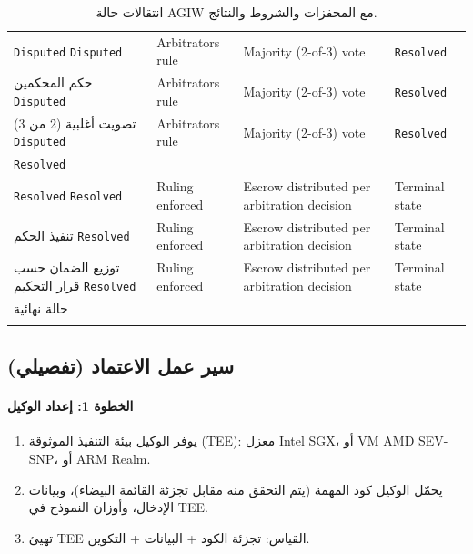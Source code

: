 \documentclass[11pt]{article}
\begin{document}
\begin{longtable}{@{}p{}p{}p{}p{}@{}}
\texttt{Disputed} \texttt{Disputed} & Arbitrators rule & Majority (2-of-3) vote & \texttt{Resolved} \\ حكم المحكمين \texttt{Disputed} & Arbitrators rule & Majority (2-of-3) vote & \texttt{Resolved} \\ تصويت أغلبية (2 من 3) \texttt{Disputed} & Arbitrators rule & Majority (2-of-3) vote & \texttt{Resolved} \\ \texttt{Resolved} \\
\texttt{Resolved} \texttt{Resolved} & Ruling enforced & Escrow distributed per arbitration decision & Terminal state \\\bottomrule تنفيذ الحكم \texttt{Resolved} & Ruling enforced & Escrow distributed per arbitration decision & Terminal state \\\bottomrule توزيع الضمان حسب قرار التحكيم \texttt{Resolved} & Ruling enforced & Escrow distributed per arbitration decision & Terminal state \\\bottomrule حالة نهائية \\\bottomrule
\caption{انتقالات حالة AGIW مع المحفزات والشروط والنتائج.}
\label{tab:agiw-states}
\end{longtable}

\subsection{سير عمل الاعتماد (تفصيلي)}
\label{sec:attestation-workflow}
\paragraph{الخطوة 1: إعداد الوكيل}
\begin{enumerate}[noitemsep]
  \item يوفر الوكيل بيئة التنفيذ الموثوقة (TEE): معزل Intel SGX، أو VM AMD SEV-SNP، أو ARM Realm.
  \item يحمّل الوكيل كود المهمة (يتم التحقق منه مقابل تجزئة القائمة البيضاء)، وبيانات الإدخال، وأوزان النموذج في TEE.
  \item تهيئ TEE القياس: تجزئة الكود + البيانات + التكوين.
\end{enumerate}
\end{document}
